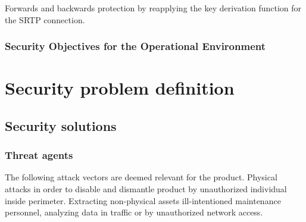\documentclass[10pt]{article}
\begin{document}

        Forwards and backwards protection by reapplying the key derivation
        function for the SRTP connection.

  \subsubsection{Security Objectives for the Operational Environment}
	\begin{itemize}
	\end{itemize}


  \section{Security problem definition}

    \subsection{Security solutions}



 \subsubsection{Threat agents}

      The following attack vectors are deemed relevant for the product.
      Physical attacks in order to disable and dismantle product by
      unauthorized individual inside perimeter. Extracting non-physical
      assets ill-intentioned maintenance personnel, analyzing data in
      traffic or by unauthorized network access.
\end{document}
